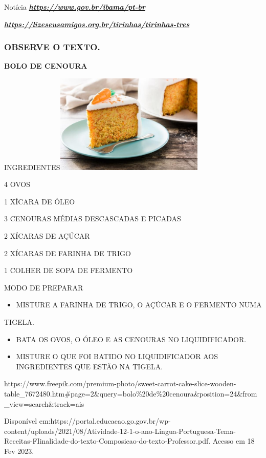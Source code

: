 \begin{escola}
Notícia
\href{https://www.gov.br/ibama/pt-br}{\textbf{\emph{https://www.gov.br/ibama/pt-br}}}

\href{https://lizeseusamigos.org.br/tirinhas/tirinhas-tres}{\textbf{\emph{https://lizeseusamigos.org.br/tirinhas/tirinhas-tres}}}

\subsubsection{OBSERVE O TEXTO. }\label{observe-o-texto.}

\textbf{BOLO DE CENOURA}

INGREDIENTES\includegraphics[width=2.79286in,height=1.86042in]{media/image153.jpg}

4 OVOS

1 XÍCARA DE ÓLEO

3 CENOURAS MÉDIAS DESCASCADAS E PICADAS

2 XÍCARAS DE AÇÚCAR

2 XÍCARAS DE FARINHA DE TRIGO

1 COLHER DE SOPA DE FERMENTO

MODO DE PREPARAR

\begin{itemize}
\item
  MISTURE A FARINHA DE TRIGO, O AÇÚCAR E O FERMENTO NUMA
\end{itemize}

TIGELA.

\begin{itemize}
\item
  BATA OS OVOS, O ÓLEO E AS CENOURAS NO LIQUIDIFICADOR.
\item
  MISTURE O QUE FOI BATIDO NO LIQUIDIFICADOR AOS INGREDIENTES QUE ESTÃO
  NA TIGELA.
\end{itemize}

https://www.freepik.com/premium-photo/sweet-carrot-cake-slice-wooden-table\_7672480.htm\#page=2\&query=bolo\%20de\%20cenoura\&position=24\&from\_view=search\&track=ais

Disponível
em:https://portal.educacao.go.gov.br/wp-content/uploads/2021/08/Atividade-12-1-o-ano-Lingua-Portuguesa-Tema-Receitas-FIinalidade-do-texto-Composicao-do-texto-Professor.pdf.
Acesso em 18 Fev 2023.


\end{escola}
